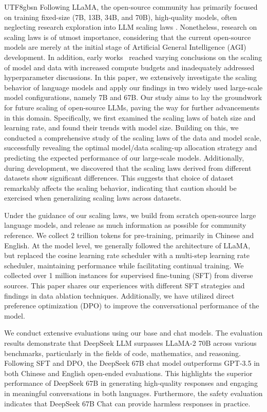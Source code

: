 \documentclass[11pt, a4paper, logo, copyright, nonumbering]{deepseek}
\begin{document}
\begin{CJK*}{UTF8}{gbsn}
Following LLaMA, the open-source community has primarily focused on training fixed-size (7B, 13B, 34B, and 70B), high-quality models, often neglecting research exploration into LLM scaling laws \citep{scalinglaw,chinchilla}. Nonetheless, research on scaling laws is of utmost importance, considering that the current open-source models are merely at the initial stage of Artificial General Intelligence (AGI) development. In addition, early works~\citep{scalinglaw, chinchilla} reached varying conclusions on the scaling of model and data with increased compute budgets and inadequately addressed hyperparameter discussions. 
In this paper, we extensively investigate the scaling behavior of language models and apply our findings in two widely used large-scale model configurations, namely 7B and 67B. Our study aims to lay the groundwork for future scaling of open-source LLMs, paving the way for further advancements in this domain.
Specifically, we first examined the scaling laws of batch size and learning rate, and found their trends with model size. Building on this, we conducted a comprehensive study of the scaling laws of the data and model scale, successfully revealing the optimal model/data scaling-up allocation strategy and predicting the expected performance of our large-scale models. Additionally, during development, we discovered that the scaling laws derived from different datasets show significant differences. 
This suggests that choice of dataset remarkably affects the scaling behavior, indicating that caution should be exercised when generalizing scaling laws across datasets.

Under the guidance of our scaling laws, we build from scratch open-source large language models, and release as much information as possible for community reference. We collect 2 trillion tokens for pre-training, primarily in Chinese and English. At the model level, we generally followed the architecture of LLaMA, but replaced the cosine learning rate scheduler with a multi-step learning rate scheduler, maintaining performance while facilitating continual training.  We collected over  1 million instances for supervised fine-tuning (SFT) \citep{ouyang2022training} from diverse sources.  This paper shares our experiences with different SFT strategies and findings in data ablation techniques. Additionally, we have utilized direct preference optimization (DPO) \citep{dpo} to improve the conversational performance of the model.

We conduct extensive evaluations using our base and chat models. The evaluation results demonstrate that DeepSeek LLM surpasses LLaMA-2 70B across various benchmarks, particularly in the fields of code, mathematics, and reasoning. 
Following SFT and DPO, the DeepSeek 67B chat model outperforms GPT-3.5 in both Chinese and English open-ended evaluations. This highlights the superior performance of DeepSeek 67B in generating high-quality responses and engaging in meaningful conversations in both languages. Furthermore, the safety evaluation indicates that DeepSeek 67B Chat can provide harmless responses in practice. 


\end{CJK*}
\end{document}
